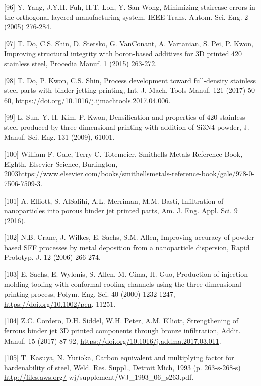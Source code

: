 \documentclass[10pt]{article}
\begin{document}
[96] Y. Yang, J.Y.H. Fuh, H.T. Loh, Y. San Wong, Minimizing staircase errors in the orthogonal layered manufacturing system, IEEE Trans. Autom. Sci. Eng. 2 (2005) 276-284.

[97] T. Do, C.S. Shin, D. Stetsko, G. VanConant, A. Vartanian, S. Pei, P. Kwon, Improving structural integrity with boron-based additives for 3D printed 420 stainless steel, Procedia Manuf. 1 (2015) 263-272.

[98] T. Do, P. Kwon, C.S. Shin, Process development toward full-density stainless steel parts with binder jetting printing, Int. J. Mach. Tools Manuf. 121 (2017) 50-60, \href{https://doi.org/10.1016/j.ijmachtools.2017.04.006}{https://doi.org/10.1016/j.ijmachtools.2017.04.006}.

[99] L. Sun, Y.-H. Kim, P. Kwon, Densification and properties of 420 stainless steel produced by three-dimensional printing with addition of Si3N4 powder, J. Manuf. Sci. Eng. 131 (2009), 61001.

[100] William F. Gale, Terry C. Totemeier, Smithells Metals Reference Book, Eighth, Elsevier Science, Burlington, 2003https://www.elsevier.com/books/smithellsmetals-reference-book/gale/978-0-7506-7509-3.

[101] A. Elliott, S. AlSalihi, A.L. Merriman, M.M. Basti, Infiltration of nanoparticles into porous binder jet printed parts, Am. J. Eng. Appl. Sci. 9 (2016).

[102] N.B. Crane, J. Wilkes, E. Sachs, S.M. Allen, Improving accuracy of powder-based SFF processes by metal deposition from a nanoparticle dispersion, Rapid Prototyp. J. 12 (2006) 266-274.

[103] E. Sachs, E. Wylonis, S. Allen, M. Cima, H. Guo, Production of injection molding tooling with conformal cooling channels using the three dimensional printing process, Polym. Eng. Sci. 40 (2000) 1232-1247, \href{https://doi.org/10.1002/pen}{https://doi.org/10.1002/pen}. 11251.

[104] Z.C. Cordero, D.H. Siddel, W.H. Peter, A.M. Elliott, Strengthening of ferrous binder jet 3D printed components through bronze infiltration, Addit. Manuf. 15 (2017) 87-92, \href{https://doi.org/10.1016/j.addma.2017.03.011}{https://doi.org/10.1016/j.addma.2017.03.011}.

[105] T. Kasuya, N. Yurioka, Carbon equivalent and multiplying factor for hardenability of steel, Weld. Res. Suppl., Detroit Mich, 1993 (p. 263-s-268-s) \href{http://files.aws.org/}{http://files.aws.org/} wj/supplement/WJ\_1993\_06\_s263.pdf.
\end{document}
